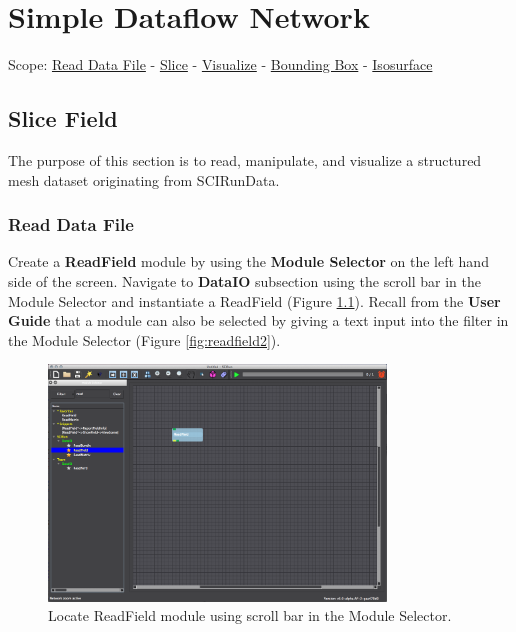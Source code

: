 \documentclass[fleqn,11pt,openany]{book}
\begin{document}
\chapter{Simple Dataflow Network}

\begin{introduction}
Scope: \hyperref[readdata]{Read Data File} - \hyperref[slice]{Slice} -
\hyperref[visualize]{Visualize} - \hyperref[bbox]{Bounding Box} - \hyperref[isosurface]{Isosurface}
\end{introduction}

\section{Slice Field}

The purpose of this section is to read, manipulate, and visualize a structured mesh dataset originating from SCIRunData. 

\subsection{Read Data File}\label{readdata}

Create a \textbf{ReadField} module by using the \textbf{Module Selector} on the left hand side of the screen. Navigate to \textbf{DataIO} subsection using the scroll bar in the Module Selector and instantiate a ReadField (Figure \ref{fig:readfield}). Recall from the \textbf{User Guide} that a module can also be selected by giving a text input into the filter in the Module Selector (Figure \ref{fig:readfield2}). 

\begin{figure}[H]
\begin{center}
\includegraphics[width=0.8\textwidth]{BasicTutorial_figures/readfield_text.png}
\caption{Locate ReadField module using scroll bar in the Module Selector.}
\label{fig:readfield}
\end{center}
\end{figure}
\end{document}
